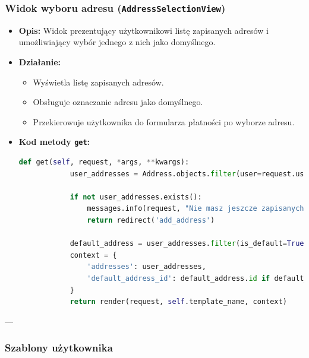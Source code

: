 \documentclass[12pt,a4paper,oneside]{article}
\theoremstyle{definition}
\numberwithin{equation}{section}
\begin{document}
\subsubsection*{Widok wyboru adresu (\texttt{AddressSelectionView})}
\begin{itemize}
    \item \textbf{Opis:} Widok prezentujący użytkownikowi listę zapisanych adresów i umożliwiający wybór jednego z nich jako domyślnego.
    \item \textbf{Działanie:}
    \begin{itemize}
        \item Wyświetla listę zapisanych adresów.
        \item Obsługuje oznaczanie adresu jako domyślnego.
        \item Przekierowuje użytkownika do formularza płatności po wyborze adresu.
    \end{itemize}
    \item \textbf{Kod metody \texttt{get}:}
    \begin{lstlisting}[language=Python, caption=Metoda \texttt{get} w \texttt{AddressSelectionView}]
        def get(self, request, *args, **kwargs):
            user_addresses = Address.objects.filter(user=request.user)
        
            if not user_addresses.exists():
                messages.info(request, "Nie masz jeszcze zapisanych adresow. Dodaj nowy adres.")
                return redirect('add_address')
        
            default_address = user_addresses.filter(is_default=True).first()
            context = {
                'addresses': user_addresses,
                'default_address_id': default_address.id if default_address else None,
            }
            return render(request, self.template_name, context)
        \end{lstlisting}

\end{itemize}

---

\subsubsection{Szablony użytkownika}
\end{document}
